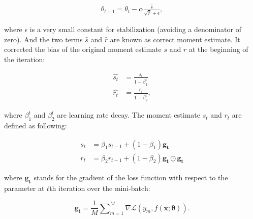\documentclass[
	parskip, 			   %
	twoside, 			   %
	DIV=14, 			   %
	BCOR=15.0mm, 		   %
	headsepline, 		   %
	open=right, 		   %
	captions=tableheading, %
	bibliography=totoc,    %
	numbers=noenddot       %
]{scrreprt}
\begin{document}
\begin{equation}
    \label{eq:Adam_GD}
    \begin{aligned}
        \theta_{t+1} = \theta_{t} - \alpha \frac{\hat{s}}{\sqrt{\hat{r}} + \epsilon},
    \end{aligned}
\end{equation}

where $\epsilon$ is a very small constant for stabilization (avoiding a denominator of zero). And the two terms $\hat{s}$ and $\hat{r}$ are known as correct moment estimate. It corrected the bias of the original moment estimate $s$ and $r$ at the beginning of the iteration:

\begin{equation}
    \label{eq:correct_moment_estimate}
    \begin{aligned}
        \hat{s_t} &= \frac{s_t}{1-\beta_1^t}
        \\
        \hat{r_t} &= \frac{r_t}{1-\beta_2^t},
    \end{aligned}
\end{equation}

where $\beta_1^t$ and $\beta_2^t$ are learning rate decay. The moment estimate $s_t$ and $r_t$ are defined as following:

\begin{equation}
    \label{eq:moment_estimate}
    \begin{aligned}
        s_t &= \beta_1 s_{t-1} + (1-\beta_1) \mathbf{g_t}
        \\
        r_t &= \beta_2 r_{t-1} + (1-\beta_2) \mathbf{g_t} \odot \mathbf{g_t}
    \end{aligned}
\end{equation}

where $\mathbf{g_t}$ stands for the gradient of the loss function with respect to the parameter at $t$th iteration over the mini-batch:

\begin{equation}
    \label{eq:mean_gradient}
    \mathbf{g_t} = \frac{1}{M} \sum\nolimits_{m=1}^M \nabla \mathcal{L}\left( y_{m},f(\mathbf{x};\mathbf{\theta}) \right).
\end{equation}
 
\end{document}
